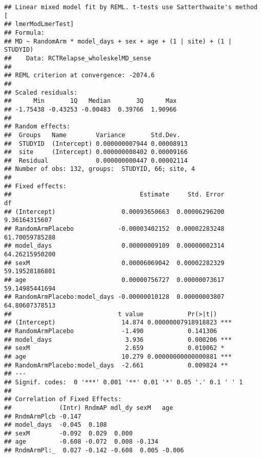 \documentclass[]{article}
\newenvironment{Shaded}{\begin{snugshade}}{\end{snugshade}}
\newcommand{\KeywordTok}[1]{\textcolor[rgb]{0.13,0.29,0.53}{\textbf{#1}}}
\newcommand{\DataTypeTok}[1]{\textcolor[rgb]{0.13,0.29,0.53}{#1}}
\newcommand{\DecValTok}[1]{\textcolor[rgb]{0.00,0.00,0.81}{#1}}
\newcommand{\StringTok}[1]{\textcolor[rgb]{0.31,0.60,0.02}{#1}}
\newcommand{\CommentTok}[1]{\textcolor[rgb]{0.56,0.35,0.01}{\textit{#1}}}
\newcommand{\OperatorTok}[1]{\textcolor[rgb]{0.81,0.36,0.00}{\textbf{#1}}}
\newcommand{\NormalTok}[1]{#1}
\theoremstyle{definition}
\theoremstyle{definition}
\theoremstyle{definition}
\theoremstyle{remark}
\begin{document}
\begin{Shaded}
\end{Shaded}

\begin{verbatim}
## Linear mixed model fit by REML. t-tests use Satterthwaite's method [
## lmerModLmerTest]
## Formula: 
## MD ~ RandomArm * model_days + sex + age + (1 | site) + (1 | STUDYID)
##    Data: RCTRelapse_wholeskelMD_sense
## 
## REML criterion at convergence: -2074.6
## 
## Scaled residuals: 
##      Min       1Q   Median       3Q      Max 
## -1.75438 -0.43253 -0.00483  0.39766  1.90966 
## 
## Random effects:
##  Groups   Name        Variance       Std.Dev.  
##  STUDYID  (Intercept) 0.000000007944 0.00008913
##  site     (Intercept) 0.000000008402 0.00009166
##  Residual             0.000000000447 0.00002114
## Number of obs: 132, groups:  STUDYID, 66; site, 4
## 
## Fixed effects:
##                                   Estimate     Std. Error             df
## (Intercept)                  0.00093650663  0.00006296200  9.36164315607
## RandomArmPlacebo            -0.00003402152  0.00002283248 61.70059785288
## model_days                   0.00000009109  0.00000002314 64.26215950200
## sexM                         0.00006069042  0.00002282329 59.19528186801
## age                          0.00000756727  0.00000073617 59.14985441694
## RandomArmPlacebo:model_days -0.00000010128  0.00000003807 64.80607378513
##                             t value            Pr(>|t|)    
## (Intercept)                  14.874 0.00000007918918823 ***
## RandomArmPlacebo             -1.490            0.141306    
## model_days                    3.936            0.000206 ***
## sexM                          2.659            0.010062 *  
## age                          10.279 0.00000000000000881 ***
## RandomArmPlacebo:model_days  -2.661            0.009824 ** 
## ---
## Signif. codes:  0 '***' 0.001 '**' 0.01 '*' 0.05 '.' 0.1 ' ' 1
## 
## Correlation of Fixed Effects:
##             (Intr) RndmAP mdl_dy sexM   age   
## RndmArmPlcb -0.147                            
## model_days  -0.045  0.108                     
## sexM        -0.092  0.029  0.000              
## age         -0.608 -0.072  0.008 -0.134       
## RndmArmPl:_  0.027 -0.142 -0.608  0.005 -0.006
\end{verbatim}
\end{document}
